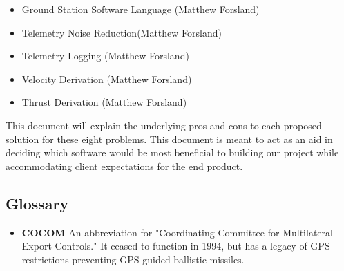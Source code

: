 \documentclass[onecolumn, draftclsnofoot,10pt, compsoc]{IEEEtran}
\begin{document}
		\begin{itemize}
			\item Ground Station Software Language (Matthew Forsland)
			\item Telemetry Noise Reduction(Matthew Forsland)
			\item Telemetry Logging (Matthew Forsland)
			\item Velocity Derivation (Matthew Forsland)
			\item Thrust Derivation (Matthew Forsland)
		\end{itemize}
		
		\noindent
		This document will explain the underlying pros and cons to each proposed solution for these eight problems.
		This document is meant to act as an aid in deciding which software would be most beneficial to building our project while accommodating client expectations for the end product.

		\subsection{Glossary}
			\begin{itemize}
				\item \textbf{COCOM}
					An abbreviation for "Coordinating Committee for Multilateral Export Controls."
					It ceased to function in 1994, but has a legacy of GPS restrictions preventing GPS-guided ballistic missiles.
			\end{itemize}
\end{document}
